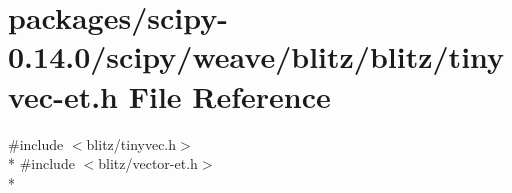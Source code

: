 \hypertarget{tinyvec-et_8h}{}\section{packages/scipy-\/0.14.0/scipy/weave/blitz/blitz/tinyvec-\/et.h File Reference}
\label{tinyvec-et_8h}
{\ttfamily \#include $<$blitz/tinyvec.\+h$>$}\\*
{\ttfamily \#include $<$blitz/vector-\/et.\+h$>$}\\*
